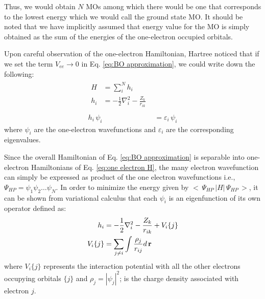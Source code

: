             Thus, we would obtain $N$ MOs among which there would be one that corresponds to the lowest energy which we would call the ground state MO. It should be noted that we have implicitly assumed that energy value for the MO is simply obtained as the sum of the energies of the one-electron occupied orbitals.

            Upon careful observation of the one-electron Hamiltonian, Hartree noticed that if we set the term $V_{ee} \to 0$ in Eq. \eqref{eq:BO approximation}, we could write down the following:
            \begin{subequations}
                \begin{align}
                    \begin{split}
                        H &= \displaystyle\sum_i^N h_i\\
                        h_i &= -\frac{1}{2} \nabla^2_i - \frac{Z_k}{r_{ik}} \label{eq:one electron H}\\
                    \end{split}\\
                    h_i\,\psi_i\, &= \varepsilon_i \, \psi_i \label{eq:one electron SE}
                \end{align}
            \end{subequations}
            where $\psi_i$ are the one-electron wavefunctions and $\varepsilon_i$ are the corresponding eigenvalues.

            Since the overall Hamiltonian of Eq. \eqref{eq:BO approximation} is separable into one-electron Hamiltonians of Eq. \eqref{eq:one electron H}, the many electron wavefunction can simply be expressed as product of the one electron wavefunctions i.e., $\Psi_{HP} = \psi_1 \psi_2 \ldots \psi_N$. In order to minimize the energy given by $<\,\Psi_{HP}\, | H |\,\Psi_{HP}\,>$, it can be shown from variational calculus that each $\psi_i$ is an eigenfunction of its own operator defined as:
            \begin{equation}\label{eq:correct Hamiltonian}
                \begin{aligned}
                    h_i &= -\frac{1}{2} \nabla^2_i - \frac{Z_k}{r_{ik}} + V_i \{j\}\\
                    V_i \{j\} &= \displaystyle\sum_{j \ne i} \int \frac{\rho_j}{r_{ij}} d\,{\mathbf {r}}
                \end{aligned}
            \end{equation}
            where $V_i \{j\}$ represents the interaction potential with all the other electrons occupying orbitals $\{j\}$ and $\rho_j = |\psi_j|^2$; is the charge density associated with electron $j$.

